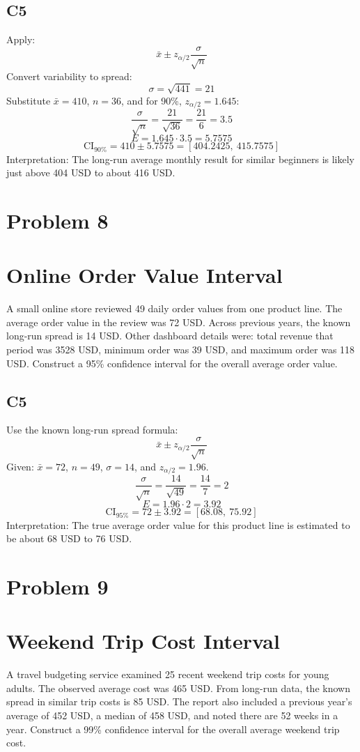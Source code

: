 \begin{ExamProblems}
		\subsection*{C5}
		Apply:
		\[
		\bar{x} \pm z_{\alpha/2}\frac{\sigma}{\sqrt{n}}
		\]
		Convert variability to spread:
		\[
		\sigma=\sqrt{441}=21
		\]
		Substitute $\bar{x}=410$, $n=36$, and for 90\%, $z_{\alpha/2}=1.645$:
		\[
		\frac{\sigma}{\sqrt{n}}=\frac{21}{\sqrt{36}}=\frac{21}{6}=3.5
		\]
		\[
		E=1.645\cdot 3.5=5.7575
		\]
		\[
		\text{CI}_{90\%}=410\pm 5.7575=[404.2425,\ 415.7575]
		\]
		Interpretation: The long-run average monthly result for similar beginners is likely just above 404 USD to about 416 USD.

		\newpage
		\item
		\section{Problem 8}
		\section{Online Order Value Interval}
		A small online store reviewed 49 daily order values from one product line.
		The average order value in the review was 72 USD.
		Across previous years, the known long-run spread is 14 USD.
		Other dashboard details were: total revenue that period was 3528 USD, minimum order was 39 USD, and maximum order was 118 USD.
		Construct a 95\% confidence interval for the overall average order value.

		\subsection*{C5}
		Use the known long-run spread formula:
		\[
		\bar{x} \pm z_{\alpha/2}\frac{\sigma}{\sqrt{n}}
		\]
		Given: $\bar{x}=72$, $n=49$, $\sigma=14$, and $z_{\alpha/2}=1.96$.
		\[
		\frac{\sigma}{\sqrt{n}}=\frac{14}{\sqrt{49}}=\frac{14}{7}=2
		\]
		\[
		E=1.96\cdot 2=3.92
		\]
		\[
		\text{CI}_{95\%}=72\pm 3.92=[68.08,\ 75.92]
		\]
		Interpretation: The true average order value for this product line is estimated to be about 68 USD to 76 USD.

		\newpage
		\item
		\section{Problem 9}
		\section{Weekend Trip Cost Interval}
		A travel budgeting service examined 25 recent weekend trip costs for young adults.
		The observed average cost was 465 USD.
		From long-run data, the known spread in similar trip costs is 85 USD.
		The report also included a previous year's average of 452 USD, a median of 458 USD, and noted there are 52 weeks in a year.
		Construct a 99\% confidence interval for the overall average weekend trip cost.


\end{ExamProblems}
